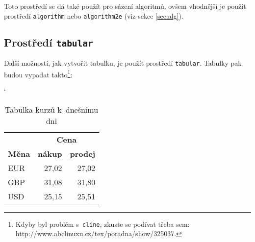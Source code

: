 \documentclass[11pt]{article}
\begin{document}
	Toto prostředí se dá také použít pro sázení algoritmů, ovšem vhodnější je použít 
	prostředí \texttt{algorithm} nebo \texttt{algorithm2e} (viz sekce \ref{sec:alg}).
	
	\subsection{Prostředí \texttt{tabular}}
	
	Další možností, jak vytvořit tabulku, je použít prostředí \texttt{tabular}.
	Tabulky pak budou vypadat takto\footnote{Kdyby byl problém s~\texttt{cline},
	zkuste se podívat třeba sem: http://www.abclinuxu.cz/tex/poradna/show/325037.}:
	
	\begin{table}[h]
		\begin{center}
			\catcode`
			\begin{tabular}{| l | r | r |} \hline
			& \multicolumn{2}{|c|}{\textbf{Cena}} \\ \cline{2-3}
				\textbf{Měna} & \textbf{nákup} & \textbf{prodej} \\ \hline
				EUR & 27,02 & 27,02 \\
				GBP & 31,08 & 31,80 \\
				USD & 25,15 & 25,51 \\ \hline
			\end{tabular}
			\caption{Tabulka kurzů k~dnešnímu dni}
			\label{table1}
		\end{center}
	\end{table}
	
\end{document}
